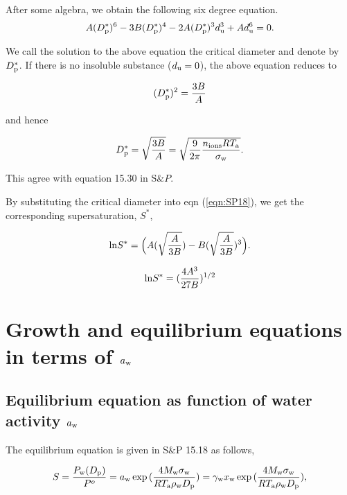 \documentclass[12pt]{article}
\begin{document}
After some algebra, we obtain the following six degree equation.
\begin{equation}\label{eqn:SP21}
A(D_{\rm p}^{*})^{6}-3B(D_{\rm p}^{*})^{4}-2 A(D_{\rm p}^{*})^{3} d_{\rm u}^{3}+ A d_{\rm u}^{6}=0.
\end{equation}

We call the solution to the above equation the critical diameter and denote by $D_{\rm p}^{*}$. If there is no insoluble substance ($d_{\rm u}=0$), the above equation reduces to 

\begin{equation}\label{eqn:SP22}
(D_{\rm p}^{*})^{2}=\frac{3B}{A} 
\end{equation}

and hence 

\begin{equation}\label{eqn:SP23}
D_{\rm p}^{*}=\sqrt{\frac{3B}{A}}= \sqrt {\frac{9}{2 \pi} \frac{n_{\rm ions} RT_{\rm a}}{\sigma_{\rm w}}}.
\end{equation}

This agree with equation 15.30 in S$\&P$.

By substituting the critical diameter into eqn (\ref{eqn:SP18}), we get the corresponding supersaturation, $S^{*}$,


\begin{equation}\label{eqn:SP24}
{\rm ln} S^{*} = \Big(A (\sqrt{\frac{A}{3B}})   -   B (\sqrt{\frac{A}{3B}}) ^{3} \Big).
\end{equation}


\begin{equation}\label{eqn:SP25}
{\rm ln}  S^{*}=(\frac{4A^{3}}{27B})^{1/2}
\end{equation}

 
\section{Growth and equilibrium equations in terms of $a_{\rm w}$} 
\subsection{Equilibrium equation as function of water activity $a_{\rm w}$}

The equilibrium equation is given in S$\&$P 15.18 as follows, 

\begin{equation}\label{eqn:1}
S=\frac{P_{\rm w}(D_{\rm p})}{P^{o}}=a_{\rm w}\exp{(\frac{4 M_{\rm w} \sigma_{\rm w}}{R T_{\rm a} \rho_{\rm w} D_{\rm p}})}=\gamma_{\rm w}x_{\rm w}\exp{(\frac{4 M_{\rm w} \sigma_{\rm w}}{R T_{\rm a} \rho_{\rm w} D_{\rm p}})},
\end{equation}
\end{document}
